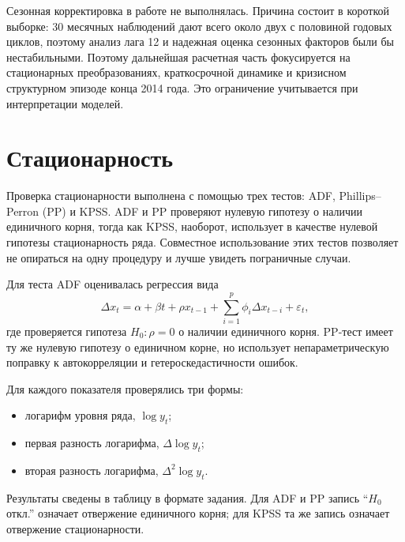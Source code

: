 \documentclass[12pt,a4paper]{article}
\begin{document}
Сезонная корректировка в работе не выполнялась. Причина состоит в короткой выборке: 30
месячных наблюдений дают всего около двух с половиной годовых циклов, поэтому анализ лага 12
и надежная оценка сезонных факторов были бы нестабильными. Поэтому дальнейшая расчетная
часть фокусируется на стационарных преобразованиях, краткосрочной динамике и кризисном
структурном эпизоде конца 2014 года. Это ограничение учитывается при интерпретации моделей.

\section{Стационарность}
Проверка стационарности выполнена с помощью трех тестов: ADF, Phillips--Perron (PP) и
KPSS. ADF и PP проверяют нулевую гипотезу о наличии единичного корня, тогда как KPSS,
наоборот, использует в качестве нулевой гипотезы стационарность ряда. Совместное
использование этих тестов позволяет не опираться на одну процедуру и лучше увидеть
пограничные случаи.

Для теста ADF оценивалась регрессия вида
\[
\Delta x_t = \alpha + \beta t + \rho x_{t-1} + \sum_{i=1}^{p}\phi_i \Delta x_{t-i} + \varepsilon_t,
\]
где проверяется гипотеза $H_0 \colon \rho = 0$ о наличии единичного корня. PP-тест имеет
ту же нулевую гипотезу о единичном корне, но использует непараметрическую поправку к
автокорреляции и гетероскедастичности ошибок.

Для каждого показателя проверялись три формы:
\begin{itemize}
\item логарифм уровня ряда, $\log y_t$;
\item первая разность логарифма, $\Delta \log y_t$;
\item вторая разность логарифма, $\Delta^2 \log y_t$.
\end{itemize}

Результаты сведены в таблицу в формате задания. Для ADF и PP запись ``$H_0$ откл.''
означает отвержение единичного корня; для KPSS та же запись означает отвержение
стационарности.
\end{document}
